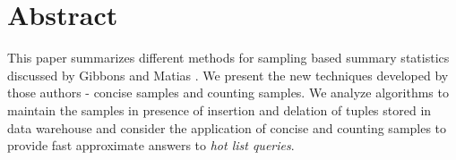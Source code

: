 \section{Abstract}
This paper summarizes different methods for sampling based summary
statistics discussed by Gibbons and Matias
\cite{GM98}. We present the new techniques developed by
those authors - concise samples and counting samples. We analyze algorithms to
maintain the samples in presence of insertion and delation of tuples
stored in data warehouse and consider the application
of concise and counting samples to provide fast approximate answers to \textit{hot list queries}.

